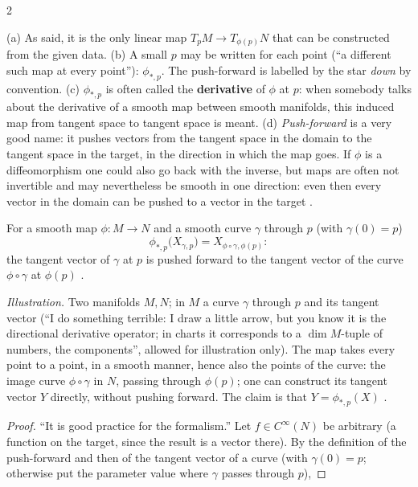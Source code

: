 \begin{paracol}{2}
\begin{remark}\label{rem:tb-names}
(a) As said, it is the only linear map $T_pM\to T_{\phi(p)}N$ that can be constructed from the given data. (b) A small $p$ may be written for each point (``a different such map at every point''): $\phi_{*,p}$. The push-forward is labelled by the star \emph{down} by convention. (c) $\phi_{*,p}$ is often called the \textbf{derivative} of $\phi$ at $p$: when somebody
talks about the derivative of a smooth map between smooth manifolds, this induced map from tangent space to tangent space is meant. (d) \emph{Push-forward} is a very good name: it pushes vectors from the tangent space in the domain to the tangent space in the target, in the direction in which the map goes. If $\phi$ is a diffeomorphism one could also go
back with the inverse, but maps are often not invertible and may nevertheless be smooth in one direction: even then every vector in the domain can be pushed to a vector in the target      .
\end{remark}
\begin{proposition}\label{prop:tb-push-curve}
For a smooth map $\phi\colon M\to N$ and a smooth curve $\gamma$ through $p$ (with $\gamma(0)=p$)
\[
  \phi_{*,p}\bigl(X_{\gamma,p}\bigr)=X_{\phi\circ\gamma,\phi(p)}:
\]
the tangent vector of $\gamma$ at $p$ is pushed forward to the tangent vector of the curve $\phi\circ\gamma$ at $\phi(p)$    .
\end{proposition}
\emph{Illustration.} Two manifolds $M,N$; in $M$ a curve $\gamma$ through $p$ and its tangent vector (``I do something terrible: I draw a little arrow, but you know it is the directional derivative operator; in charts it corresponds to a $\dim M$-tuple of numbers, the components'', allowed for illustration only). The map takes every point to a point, in a smooth manner,
hence also the points of the curve: the image curve $\phi\circ\gamma$ in $N$, passing through $\phi(p)$; one can construct its tangent vector $Y$ directly, without pushing forward. The claim is that $Y=\phi_{*,p}(X)$      .
\begin{proof}
``It is good practice for the formalism.'' Let $f\in C^\infty(N)$ be arbitrary (a function on the target, since the result is a vector there). By the definition of the push-forward and then of the tangent vector of a curve (with $\gamma(0)=p$; otherwise put the parameter value where $\gamma$ passes through $p$),

\end{proof}
\end{paracol}
